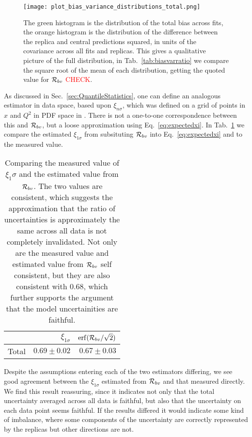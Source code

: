\begin{figure}[h]
    \centering
    \texttt{[image: plot\_bias\_variance\_distributions\_total.png]}
    \caption{The green histogram is the distribution of the total bias across fits,
    the orange histogram is the distribution of the difference between the
    replica and central predictions squared, in units of the covariance
    across all fits and replicas. This gives a qualitative picture of the full
    distribution, in Tab.~\ref{tab:biasvarratio} we compare the square root of the
    mean of each distribution, getting the quoted value for $\mathcal{R}_{bv}$ \textcolor{red}{CHECK}.}
\end{figure}

As discussed in Sec.~\ref{sec:QuantileStatistics}, one can define an analogous
estimator in data space, based upon $\xi_{n\sigma}$, which was defined on a grid
of points in $x$ and $Q^2$ in PDF space in \cite{nnpdf30}. There is not
a one-to-one correspondence
between this and $\mathcal{R}_{bv}$, but a loose approximation using
Eq.~\ref{eq:expectedxi}. In Tab.~\ref{tab:xicomparison} we compare the estimated
$\xi_{1\sigma}$ from
subsituting $\mathcal{R}_{bv}$ into Eq.~\ref{eq:expectedxi} and to the
measured value.
\begin{table}[h]
    \begin{center}
        \begin{tabular}{lrr}
            \toprule
            {}     & $\xi_{1\sigma}$ & ${\rm erf}(\mathcal{R}_{bv}/\sqrt{2})$ \\
            \midrule
            Total  & $0.69\pm0.02$   & $0.67\pm0.03$                  \\
            \bottomrule
            \end{tabular}
    \end{center}
    \caption{
        Comparing the measured value of $\xi_1\sigma$ and the estimated
        value from $\mathcal{R}_{bv}$. The two values are consistent, which
        suggests the approximation that the ratio of uncertainties is
        approximately the same across all data is not completely invalidated.
        Not only are the measured value and estimated value from $\mathcal{R}_{bv}$
        self consistent, but they are also consistent with $0.68$, which
        further supports the argument that the model uncertainities are
        faithful.
    }
    \label{tab:xicomparison}
\end{table}
Despite the assumptions entering each of the two estimators differing, we see
good agreement between the $\xi_{1\sigma}$ estimated from $\mathcal{R}_{bv}$
and that measured directly. We find this result reassuring, since it indicates
not only that the total uncertainty averaged across all data is faithful, but
also that the uncertainty on each data point seems faithful. If the results
differed it would indicate some kind of imbalance, where some components
of the uncertainty are correctly represented by the replicas but other directions
are not.


